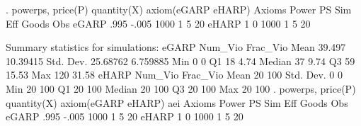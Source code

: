 . powerps, price(P) quantity(X) axiom(eGARP eHARP)
{\smallskip}
      Axioms {\VBAR}     Power         PS        Sim        Eff      Goods        Obs 
       eGARP {\VBAR}      .995      -.005       1000          1          5         20 
       eHARP {\VBAR}         1          0       1000          1          5         20 
 
Summary statistics for simulations:
{\smallskip}
       eGARP {\VBAR}   Num_Vio   Frac_Vio 
        Mean {\VBAR}    39.497   10.39415 
   Std. Dev. {\VBAR}  25.68762   6.759885 
         Min {\VBAR}         0          0 
          Q1 {\VBAR}        18       4.74 
      Median {\VBAR}        37       9.74 
          Q3 {\VBAR}        59      15.53 
         Max {\VBAR}       120      31.58 
{\smallskip}
{\smallskip}
       eHARP {\VBAR}   Num_Vio   Frac_Vio 
        Mean {\VBAR}        20        100 
   Std. Dev. {\VBAR}         0          0 
         Min {\VBAR}        20        100 
          Q1 {\VBAR}        20        100 
      Median {\VBAR}        20        100 
          Q3 {\VBAR}        20        100 
         Max {\VBAR}        20        100 
{\smallskip}
{\smallskip}
. powerps, price(P) quantity(X) axiom(eGARP eHARP) aei
{\smallskip}
      Axioms {\VBAR}     Power         PS        Sim        Eff      Goods        Obs 
       eGARP {\VBAR}      .995      -.005       1000          1          5         20 
       eHARP {\VBAR}         1          0       1000          1          5         20 
 
